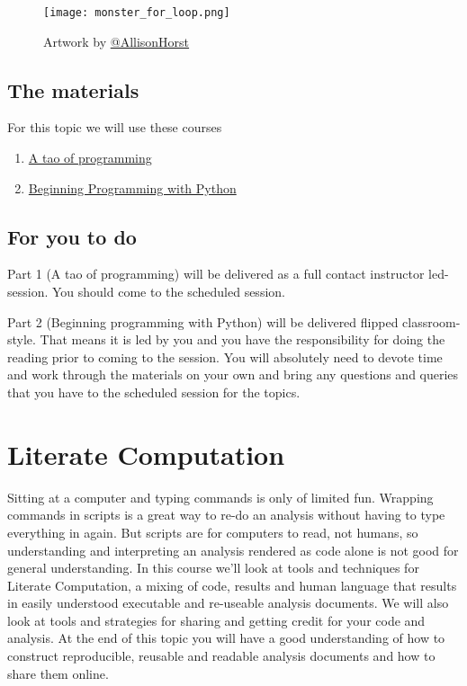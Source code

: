 \documentclass[
]{book}
\providecommand{\tightlist}{%
  \setlength{\itemsep}{0pt}\setlength{\parskip}{0pt}}
\begin{document}
\begin{figure}
\centering
\texttt{[image: monster\_for\_loop.png]}
\caption{\label{fig:unnamed-chunk-8}Artwork by \href{https://github.com/allisonhorst}{@AllisonHorst}}
\end{figure}

\hypertarget{the-materials-5}{%
\section{The materials}\label{the-materials-5}}

For this topic we will use these courses

\begin{enumerate}
\def\labelenumi{\arabic{enumi}.}
\tightlist
\item
  \href{https://danmaclean.github.io/tao_of_programming/}{A tao of programming}
\item
  \href{https://danmaclean.github.io/programming_with_python/}{Beginning Programming with Python}
\end{enumerate}

\hypertarget{for-you-to-do-5}{%
\section{For you to do}\label{for-you-to-do-5}}

Part 1 (A tao of programming) will be delivered as a full contact instructor led-session. You should come to the scheduled session.

Part 2 (Beginning programming with Python) will be delivered flipped classroom-style. That means it is led by you and you have the responsibility for doing the reading prior to coming to the session. You will absolutely need to devote time and work through the materials on your own and bring any questions and queries that you have to the scheduled session for the topics.

\hypertarget{literate-computation}{%
\chapter{Literate Computation}\label{literate-computation}}

Sitting at a computer and typing commands is only of limited fun. Wrapping commands in scripts is a great way to re-do an analysis without having to type everything in again. But scripts are for computers to read, not humans, so understanding and interpreting an analysis rendered as code alone is not good for general understanding. In this course we'll look at tools and techniques for Literate Computation, a mixing of code, results and human language that results in easily understood executable and re-useable analysis documents. We will also look at tools and strategies for sharing and getting credit for your code and analysis. At the end of this topic you will have a good understanding of how to construct reproducible, reusable and readable analysis documents and how to share them online.
\end{document}
